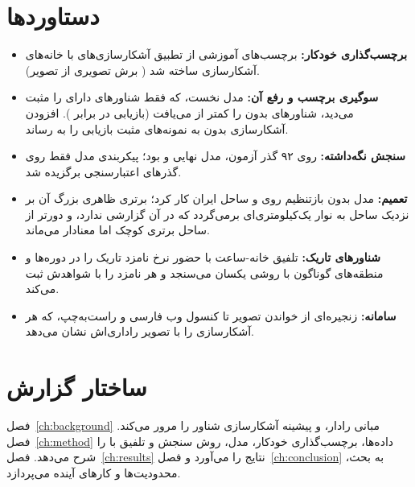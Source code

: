 \section{دستاوردها}
\begin{itemize}
\item \textbf{برچسب‌گذاری خودکار:} برچسب‌های آموزشی از تطبیق آشکارسازی‌های  با
خانه‌های آشکارسازی  ساخته شد (\dataChips{} برش تصویری از \dataScenes{} تصویر).
\item \textbf{سوگیری برچسب و رفع آن:} مدل نخست، که فقط شناورهای دارای  را مثبت
می‌دید، شناورهای بدون  را کمتر از  می‌یافت (بازیابی \darkRecallRunOne{} در
برابر \darkRecallCfar). افزودن \dataTrainDark{} آشکارسازی بدون  به نمونه‌های مثبت
بازیابی را به \darkRecallModel{} رساند.
\item \textbf{سنجش نگه‌داشته:} روی ۹۲ گذر آزمون،  مدل نهایی \testFOneModel{} و
 \testFOneCfar{} بود؛ پیکربندی مدل فقط روی گذرهای اعتبارسنجی برگزیده شد.
\item \textbf{تعمیم:} مدل بدون بازتنظیم روی  و ساحل ایران کار کرد؛ برتری
ظاهری بزرگ آن بر  نزدیک ساحل به نوار یک‌کیلومتری‌ای برمی‌گردد که  در آن
گزارشی ندارد، و دورتر از ساحل برتری کوچک اما معنادار می‌ماند.
\item \textbf{شناورهای تاریک:} تلفیق خانه-ساعت با حضور  نرخ نامزد تاریک را در دوره‌ها و
منطقه‌های گوناگون با روشی یکسان می‌سنجد و هر نامزد را با شواهدش ثبت می‌کند.
\item \textbf{سامانه:} زنجیره‌ای از خواندن تصویر تا کنسول وب فارسی و راست‌به‌چپ، که هر
آشکارسازی را با تصویر راداری‌اش نشان می‌دهد.
\end{itemize}

\section{ساختار گزارش}
فصل~\ref{ch:background} مبانی رادار،  و پیشینه آشکارسازی شناور را مرور می‌کند.
فصل~\ref{ch:method} داده‌ها، برچسب‌گذاری خودکار، مدل، روش سنجش و تلفیق با  را شرح
می‌دهد. فصل~\ref{ch:results} نتایج را می‌آورد و فصل~\ref{ch:conclusion} به بحث، محدودیت‌ها و
کارهای آینده می‌پردازد.
